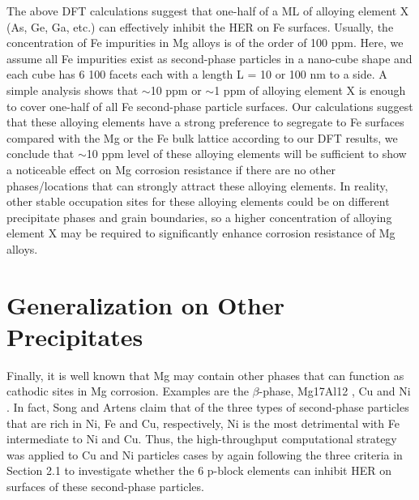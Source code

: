 The above DFT calculations suggest that one-half of a \ac{ML} of alloying element X (As, Ge, Ga, etc.) can effectively inhibit the HER on Fe surfaces. Usually, the concentration of Fe impurities in Mg alloys is of the order of 100 ppm. Here, we assume all Fe impurities exist as second-phase particles in a nano-cube shape and each cube has 6 {100} facets each with a length L = 10 or 100 nm to a side. A simple analysis shows that $\sim$10 ppm or $\sim$1 ppm of alloying element X is enough to cover one-half of all Fe second-phase particle surfaces. Our calculations suggest that these alloying elements have a strong preference to segregate to Fe surfaces compared with the Mg or the Fe bulk lattice according to our DFT results, we conclude that $\sim$10 ppm level of these alloying elements will be sufficient to show a noticeable effect on Mg corrosion resistance if there are no other phases/locations that can strongly attract these alloying elements. In reality, other stable occupation sites for these alloying elements could be on different precipitate phases and grain boundaries, so a higher concentration of alloying element X may be required to significantly enhance corrosion resistance of Mg alloys.

\section{Generalization on Other Precipitates}

Finally, it is well known that Mg may contain other phases that can function as cathodic sites in Mg corrosion. Examples are the $\beta$-phase, Mg17Al12 \cite{guo2017influence}, Cu \cite{kawabata2012influence} and Ni \cite{hanawalt1942corrosion}. In fact, Song and Artens \cite{song2003understanding} claim that of the three types of second-phase particles that are rich in Ni, Fe and Cu, respectively, Ni is the most detrimental with Fe intermediate to Ni and Cu. Thus, the high-throughput computational strategy was applied to Cu and Ni particles cases by again following the three criteria in Section 2.1 to investigate whether the 6 p-block elements can inhibit HER on surfaces of these second-phase particles. 

